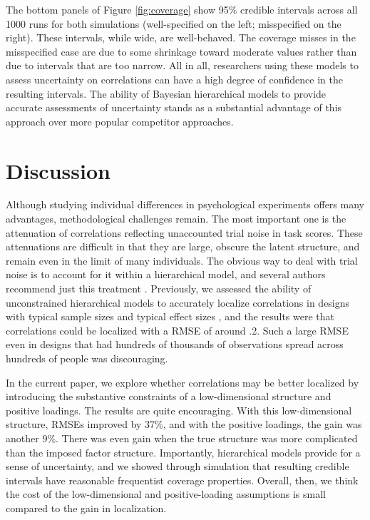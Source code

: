 \documentclass[man, 12pt]{apa7} %
\begin{document}
The bottom panels of Figure \ref{fig:coverage} show 95\% credible intervals across all 1000 runs for both simulations (well-specified on the left; misspecified on the right).   These intervals, while wide, are well-behaved.  The coverage misses in the misspecified case are due to some shrinkage toward moderate values rather than due to intervals that are too narrow.  All in all, researchers using these models to assess uncertainty on correlations can have a high degree of confidence in the resulting intervals.  The ability of Bayesian hierarchical models to provide accurate assessments of uncertainty stands as a substantial advantage of this approach over more popular competitor approaches.

\section{Discussion}

Although studying individual differences in psychological experiments offers many advantages, methodological challenges remain.  The most important one is the attenuation of correlations reflecting unaccounted trial noise in task scores.  These attenuations are difficult in that they are large, obscure the latent structure, and remain even in the limit of many individuals.  The obvious way to deal with trial noise is to account for it within a hierarchical model, and several authors recommend just this treatment \parencite[]{Haines.etal.2023, Matzke.etal.2017}.  Previously, we assessed the ability of unconstrained hierarchical models to accurately localize correlations in designs with typical sample sizes and typical effect sizes \parencite[]{Rouder.etal.2023}, and the results were that correlations could be localized with a RMSE of around .2.  Such a large RMSE even in designs that had hundreds of thousands of observations spread across hundreds of people was discouraging.

In the current paper, we explore whether correlations may be better localized by introducing the substantive constraints of a low-dimensional structure and positive loadings.  The results are quite encouraging.  With this low-dimensional structure, RMSEs improved by 37\%, and with the positive loadings, the gain was another 9\%.  There was even gain when the true structure was more complicated than the imposed factor structure.  Importantly, hierarchical models provide for a sense of uncertainty, and we showed through simulation that resulting credible intervals have reasonable frequentist coverage properties.  Overall, then, we think the cost of the low-dimensional and positive-loading assumptions is small compared to the gain in localization.
\end{document}
